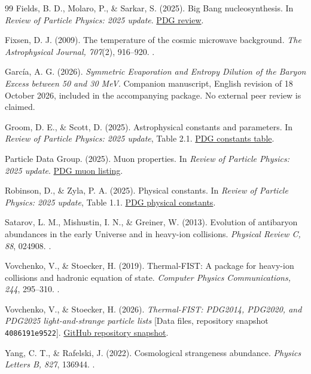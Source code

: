 \begin{thebibliography}{99}\small
\setlength{\itemsep}{2pt}
Fields, B. D., Molaro, P., \& Sarkar, S. (2025).
Big Bang nucleosynthesis. In \emph{Review of Particle Physics: 2025 update}.
\href{https://pdg.lbl.gov/2025/reviews/rpp2025-rev-bbang-nucleosynthesis.pdf}{PDG review}.

Fixsen, D. J. (2009).
The temperature of the cosmic microwave background.
\emph{The Astrophysical Journal, 707}(2), 916--920.
.

García, A. G. (2026).
\emph{Symmetric Evaporation and Entropy Dilution of the Baryon Excess between 50 and 30 MeV}.
Companion manuscript, English revision of 18 October 2026, included in the accompanying package. No external peer review is claimed.

Groom, D. E., \& Scott, D. (2025).
Astrophysical constants and parameters. In \emph{Review of Particle Physics: 2025 update}, Table 2.1.
\href{https://pdg.lbl.gov/2025/reviews/rpp2025-rev-astrophysical-constants.pdf}{PDG constants table}.

Particle Data Group. (2025).
Muon properties. In \emph{Review of Particle Physics: 2025 update}.
\href{https://pdg.lbl.gov/2025/listings/rpp2025-list-muon.pdf}{PDG muon listing}.

Robinson, D., \& Zyla, P. A. (2025).
Physical constants. In \emph{Review of Particle Physics: 2025 update}, Table 1.1.
\href{https://pdg.lbl.gov/2025/reviews/rpp2025-rev-phys-constants.pdf}{PDG physical constants}.

Satarov, L. M., Mishustin, I. N., \& Greiner, W. (2013).
Evolution of antibaryon abundances in the early Universe and in heavy-ion collisions.
\emph{Physical Review C, 88}, 024908.
.

Vovchenko, V., \& Stoecker, H. (2019).
Thermal-FIST: A package for heavy-ion collisions and hadronic equation of state.
\emph{Computer Physics Communications, 244}, 295--310.
.

Vovchenko, V., \& Stoecker, H. (2026).
\emph{Thermal-FIST: PDG2014, PDG2020, and PDG2025 light-and-strange particle lists}
[Data files, repository snapshot \texttt{4086191e9522}].
\href{https://github.com/vlvovch/Thermal-FIST/tree/4086191e952285cd572ba2bbbefb2fdc55401c9b/input/list}{GitHub repository snapshot}.

Yang, C. T., \& Rafelski, J. (2022).
Cosmological strangeness abundance.
\emph{Physics Letters B, 827}, 136944.
.

\end{thebibliography}
